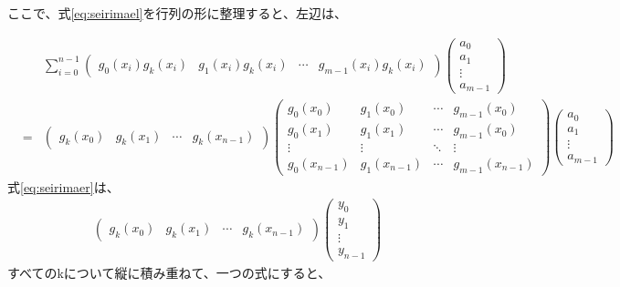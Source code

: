 \documentclass{jsarticle}
\begin{document}
ここで、式\ref{eq:seirimael}を行列の形に整理すると、左辺は、

\begin{eqnarray*}
    &&
    \sum^{n-1}_{i=0}
    \left(
      \begin{array}{cccc}
        g_0(x_i)g_k(x_i) & g_1(x_i)g_k(x_i) & \cdots & g_{m-1}(x_i)g_k(x_i)
      \end{array}
    \right)
    \left(
      \begin{array}{c}
        a_0 \\ a_1 \\ \vdots \\ a_{m-1}
      \end{array}
    \right)
    \\ &=&
    \left(
      \begin{array}{cccc}
        g_k(x_0) & g_k(x_1) & \cdots & g_k(x_{n-1})
      \end{array}
    \right)
    \left(
      \begin{array}{cccc}
        g_0(x_0) & g_1(x_0) & \cdots & g_{m-1}(x_0) \\
        g_0(x_1) & g_1(x_1) & \cdots & g_{m-1}(x_0) \\
        \vdots & \vdots & \ddots & \vdots \\
        g_0(x_{n-1}) & g_1(x_{n-1}) & \cdots & g_{m-1}(x_{n-1})  
      \end{array}
    \right)
    \left(
      \begin{array}{c}
        a_0 \\ a_1 \\ \vdots \\ a_{m-1}
      \end{array}
    \right)
\end{eqnarray*}
式\ref{eq:seirimaer}は、
\begin{eqnarray*}
    \left(
      \begin{array}{cccc}
        g_k(x_0) & g_k(x_1) & \cdots & g_k(x_{n-1})
      \end{array}
    \right)
    \left(
      \begin{array}{c}
        y_0 \\ y_1 \\ \vdots \\ y_{n-1}
      \end{array}
    \right)
\end{eqnarray*}
すべてのkについて縦に積み重ねて、一つの式にすると、
\end{document}
